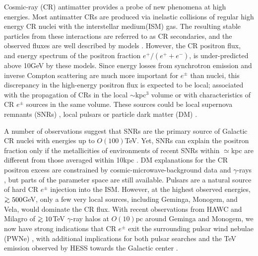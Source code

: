 \documentclass[aps,prd,twocolumn,amsmath,superscriptaddress,amssymb,showpacs,floatfix,nofootinbib]{revtex4-1}
\def\gsim{\mathrel{\raise.3ex\hbox{$>$\kern-.75em\lower1ex\hbox{$\sim$}}}}
\begin{document}
Cosmic-ray (CR) antimatter provides a probe of new phenomena at high
energies. Most antimatter CRs are produced via inelastic
collisions of regular high energy CR nuclei with the
interstellar medium(ISM) gas. The resulting stable particles
from these interactions are referred to as CR secondaries, and
the observed fluxes are well described by models
\cite{Moskalenko:2001ya, Kachelriess:2015wpa, GALPROPSite,
Strong:2015zva, Evoli:2008dv, DRAGONweb, Evoli:2011id,
Pato:2010ih}.  However, the CR positron flux, and energy
spectrum of the positron fraction $e^{+}/(e^{+} + e^{-})$,
is under-predicted above 10GeV by these models. Since energy losses 
from synchrotron emission and inverse Compton scattering are much 
more important for $e^{\pm}$ 
than nuclei, this discrepancy in the high-energy positron flux is expected to
be local; associated with the propagation of CRs in 
the local $\sim$kpc$^3$ volume
\cite{DiBernardo:2010is} or with characteristics of CR
$e^{\pm}$ sources in the same volume.  These sources could be
local supernova remnants (SNRs) \cite{Blasi:2009hv,
Mertsch:2009ph, Ahlers:2009ae, Blasi:2009bd, Kawanaka:2010uj, Fujita:2009wk,
Cholis:2013lwa, Mertsch:2014poa, DiMauro:2014iia, Kohri:2015mga}, local pulsars
\cite{1987ICRC....2...92H, 1995PhRvD..52.3265A, 1995A&A...294L..41A, Hooper:2008kg, Yuksel:2008rf, Profumo:2008ms,
Malyshev:2009tw, Kawanaka:2009dk, Grasso:2009ma, Linden:2013mqa, Cholis:2013psa,
Yuan:2013eja, Yin:2013vaa} or particle dark matter (DM)
\cite{Bergstrom:2008gr, Cirelli:2008jk, Cholis:2008hb,
Cirelli:2008pk, Nelson:2008hj, ArkaniHamed:2008qn,
Cholis:2008qq, Cholis:2008wq, Harnik:2008uu, Fox:2008kb,
Pospelov:2008jd, MarchRussell:2008tu, Chang:2011xn,
Cholis:2013psa,  Dienes:2013xff, Finkbeiner:2007kk,
Kopp:2013eka, Dev:2013hka}.

A number of observations suggest that SNRs are
the primary source of Galactic CR nuclei with energies up to
$O(100)$TeV.  Yet, SNRs can explain the
positron fraction only if the metallicities of environments
of recent SNRs within $\simeq$kpc are different from those averaged
within 10kpc \cite{Cholis:2013lwa, Mertsch:2014poa, Cholis:2017qlb, Tomassetti:2017izg}. 
DM explanations for the CR positron excess are constrained by
cosmic-microwave-background data \cite{Slatyer:2009yq, Evoli:2012zz,
Madhavacheril:2013cna,  Ade:2015xua, Slatyer:2015jla,
Poulin:2016nat} and $\gamma$-rays \cite{Tavakoli:2013zva,
Geringer-Sameth:2014qqa, Ackermann:2015zua}, but parts of the
parameter space are still available.  Pulsars
are a natural source of hard CR $e^{\pm}$ injection into the
ISM.  However, at the highest observed energies, $\gsim 500$GeV,
only a few very local sources, including Geminga, Monogem, and
Vela, would dominate the CR flux.  With recent observations from
HAWC \cite{Abeysekara:2017hyn, Abeysekara:2017old} and Milagro
\cite{Abdo:2009ku} of $\gsim 10$TeV $\gamma$-ray halos
at $O(10)$pc around Geminga and Monogem, we now have strong
indications that CR $e^{\pm}$ exit the surrounding pulsar wind
nebulae (PWNe) \cite{Hooper:2017gtd}, with additional
implications for both pulsar searches
\cite{Linden:2017vvb} and the TeV emission observed by HESS
\cite{Abramowski:2016mir} towards the Galactic center
\cite{Hooper:2017rzt}.
 
\end{document}
